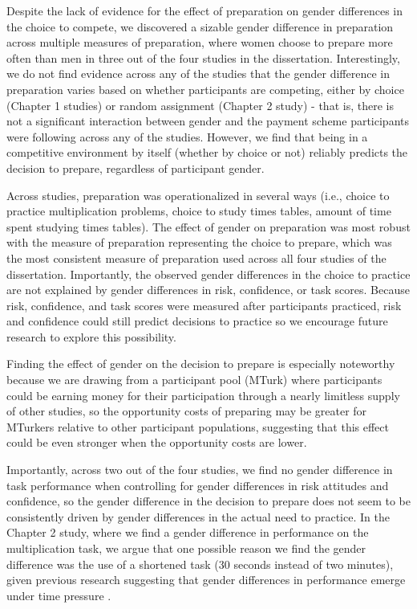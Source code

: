 \documentclass[a4paper, nobind]{templates/ociamthesis}
\begin{document}
Despite the lack of evidence for the effect of preparation on gender differences in the choice to compete, we discovered a sizable gender difference in preparation across multiple measures of preparation, where women choose to prepare more often than men in three out of the four studies in the dissertation. Interestingly, we do not find evidence across any of the studies that the gender difference in preparation varies based on whether participants are competing, either by choice (Chapter 1 studies) or random assignment (Chapter 2 study) - that is, there is not a significant interaction between gender and the payment scheme participants were following across any of the studies. However, we find that being in a competitive environment by itself (whether by choice or not) reliably predicts the decision to prepare, regardless of participant gender.

Across studies, preparation was operationalized in several ways (i.e., choice to practice multiplication problems, choice to study times tables, amount of time spent studying times tables). The effect of gender on preparation was most robust with the measure of preparation representing the choice to prepare, which was the most consistent measure of preparation used across all four studies of the dissertation. Importantly, the observed gender differences in the choice to practice are not explained by gender differences in risk, confidence, or task scores. Because risk, confidence, and task scores were measured after participants practiced, risk and confidence could still predict decisions to practice so we encourage future research to explore this possibility.

Finding the effect of gender on the decision to prepare is especially noteworthy because we are drawing from a participant pool (MTurk) where participants could be earning money for their participation through a nearly limitless supply of other studies, so the opportunity costs of preparing may be greater for MTurkers relative to other participant populations, suggesting that this effect could be even stronger when the opportunity costs are lower.

Importantly, across two out of the four studies, we find no gender difference in task performance when controlling for gender differences in risk attitudes and confidence, so the gender difference in the decision to prepare does not seem to be consistently driven by gender differences in the actual need to practice. In the Chapter 2 study, where we find a gender difference in performance on the multiplication task, we argue that one possible reason we find the gender difference was the use of a shortened task (30 seconds instead of two minutes), given previous research suggesting that gender differences in performance emerge under time pressure \autocite{Shurchkov2012}.
\end{document}
